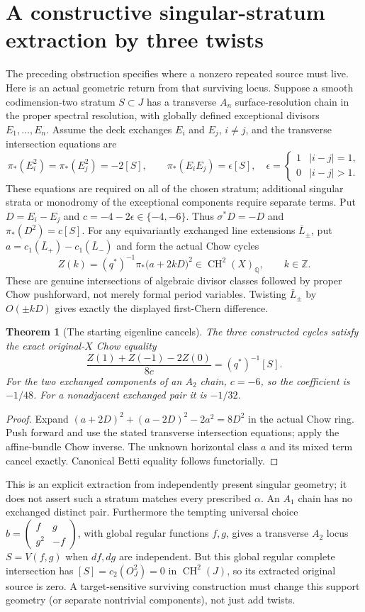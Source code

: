\documentclass[11pt]{article}
\newtheorem{theorem}{Theorem}[section]
\newcommand{\CH}{\operatorname{CH}}
\begin{document}
\section{A constructive singular-stratum extraction by three twists}
The preceding obstruction specifies where a nonzero repeated source must live.
Here is an actual geometric return from that surviving locus. Suppose a smooth
codimension-two stratum $S\subset J$ has a transverse $A_n$ surface-resolution
chain in the proper spectral resolution, with globally defined exceptional
divisors $E_1,\ldots,E_n$. Assume the deck exchanges $E_i$ and $E_j$, $i\ne j$,
and the transverse intersection equations are
\[
 \pi_*(E_i^2)=\pi_*(E_j^2)=-2[S],\qquad
 \pi_*(E_iE_j)=\epsilon[S],\quad
 \epsilon=\begin{cases}1&|i-j|=1,\\0&|i-j|>1.\end{cases}
\]
These equations are required on all of the chosen stratum; additional singular
strata or monodromy of the exceptional components require separate terms.
Put $D=E_i-E_j$ and $c=-4-2\epsilon\in\{-4,-6\}$. Thus
$\sigma^*D=-D$ and $\pi_*(D^2)=c[S]$.
For any equivariantly exchanged line extensions $\bar L_\pm$, put
$a=c_1(\bar L_+)-c_1(\bar L_-)$ and form the actual Chow cycles
\[
 Z(k)=(q^*)^{-1}\pi_*\bigl(a+2kD\bigr)^2\in\CH^2(X)_\mathbb Q,
 \qquad k\in\mathbb Z.
\]
These are genuine intersections of algebraic divisor classes followed by
proper Chow pushforward, not merely formal period variables. Twisting
$\bar L_\pm$ by $O(\pm kD)$ gives exactly the displayed first-Chern difference.
\begin{theorem}[The starting eigenline cancels]
The three constructed cycles satisfy the exact original-$X$ Chow equality
\[
 \boxed{\frac{Z(1)+Z(-1)-2Z(0)}{8c}=(q^*)^{-1}[S].}
\]
For the two exchanged components of an $A_2$ chain, $c=-6$, so the coefficient
is $-1/48$. For a nonadjacent exchanged pair it is $-1/32$.
\end{theorem}
\begin{proof}
Expand $(a+2D)^2+(a-2D)^2-2a^2=8D^2$ in the actual Chow ring.
Push forward and use the stated transverse intersection equations; apply
the affine-bundle Chow inverse. The unknown horizontal class $a$ and its mixed
term cancel exactly. Canonical Betti equality follows functorially.
\end{proof}
This is an explicit extraction from independently present singular geometry;
it does not assert such a stratum matches every prescribed $\alpha$. An $A_1$
chain has no exchanged distinct pair. Furthermore the tempting universal
choice $b=\left(\begin{smallmatrix}f&g\\g^2&-f\end{smallmatrix}\right)$,
with global regular functions $f,g$, gives a transverse $A_2$ locus
$S=V(f,g)$ when $df,dg$ are independent. But this global regular complete
intersection has $[S]=c_2(O_J^2)=0$ in $\CH^2(J)$, so its extracted original
source is zero. A target-sensitive surviving construction must change this
support geometry (or separate nontrivial components), not just add twists.
\end{document}
